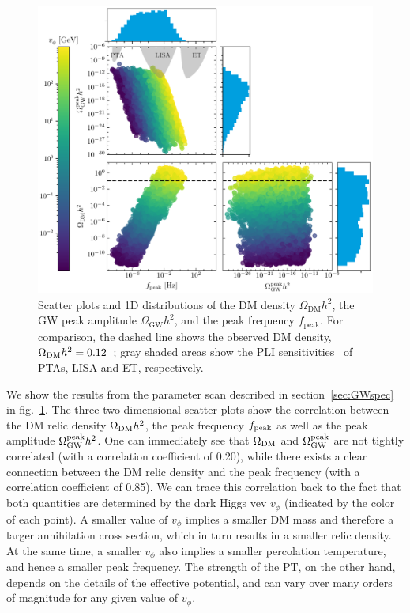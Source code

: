 \begin{figure}[t!]
	\centering
	\includegraphics[width=\textwidth]{thesisplots/lisa/thesis_LISA_5}
	\caption{Scatter plots and 1D distributions of the \ac{DM} density $\Omega_\mathrm{DM} h^2$, the \ac{GW} peak amplitude $\Omega_\mathrm{GW} h^2$, and the peak frequency $f_\mathrm{peak}$. For comparison, the dashed line shows the observed \ac{DM} density, $\Omega_{\text{DM}} h^2 = 0.12$~\cite{Planck:2018vyg}; gray shaded areas show the \ac{PLI} sensitivities~\cite{Breitbach:2018ddu} of \acp{PTA}, \ac{LISA} and \ac{ET}, respectively.}
	\label{fig:triangle-unrestr}
\end{figure}

We show the results from the parameter scan described in section~\ref{sec:GWspec} in fig.~\ref{fig:triangle-unrestr}. The three two-dimensional scatter plots show the correlation between the \ac{DM} relic density $\Omega_{\text{DM}} h^2$, the peak frequency $f_{\text{peak}}$ as well as the peak amplitude $\Omega_{\text{GW}}^{\text{peak}} h^2$. One can immediately see that $\Omega_{\text{DM}}$ and $\Omega_{\text{GW}}^{\text{peak}}$ are not tightly correlated (with a correlation coefficient of 0.20), while there exists a clear connection between the \ac{DM} relic density and the peak frequency (with a correlation coefficient of 0.85). We  can trace this correlation back to the fact that both quantities are determined by the dark Higgs \ac{vev} $v_{\phi}$ (indicated by the color of each point). A smaller value of $v_{\phi}$ implies a smaller \ac{DM} mass and therefore a larger annihilation cross section, which in turn results in a smaller relic density. At the same time, a smaller $v_{\phi}$ also implies a smaller percolation temperature, and hence a smaller peak frequency. The strength of the \ac{PT}, on the other hand, depends on the details of the effective potential, and can vary over many orders of magnitude for any given value of $v_{\phi}$.

